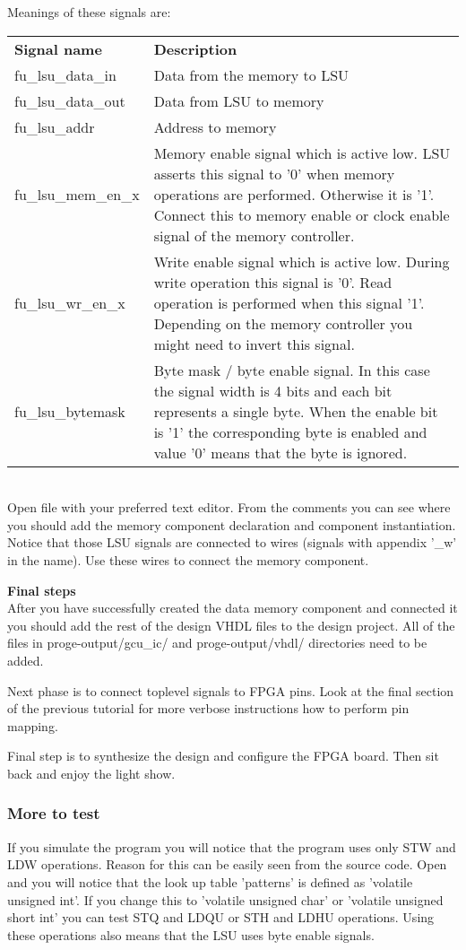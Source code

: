 \documentclass[twoside]{tceusermanual}
\begin{document}
Meanings of these signals are:

\begin{tabular}{p{}p{}}
 \textbf{Signal name} & \textbf{Description} \\
 fu\_lsu\_data\_in & Data from the memory to LSU \\
 fu\_lsu\_data\_out & Data from LSU to memory \\
 fu\_lsu\_addr & Address to memory \\
 fu\_lsu\_mem\_en\_x & Memory enable signal which is active low. LSU asserts
 this signal to '0' when memory operations are performed. Otherwise it is '1'.
 Connect this to memory enable or clock enable signal of the memory
 controller. \\
 fu\_lsu\_wr\_en\_x & Write enable signal which is active low. During write
 operation this signal is '0'. Read operation is performed when this signal
 '1'. Depending on the memory controller you might need to invert this
 signal. \\
 fu\_lsu\_bytemask & Byte mask / byte enable signal. In this case the signal
 width is 4 bits and each bit represents a single byte. When the enable bit is
 '1' the corresponding byte is enabled and value '0' means that the byte is
 ignored. \\
\end{tabular} \\

Open file  with your preferred text editor.
From the comments you can see where you should add the memory component
declaration and component instantiation. Notice that those LSU signals are 
connected to wires (signals with appendix '\_w' in the name). Use these wires
to connect the memory component.

\textbf{Final steps} \\
After you have successfully created the data memory component and connected it
you should add the rest of the design VHDL files to the design project. All of
the files in proge-output/gcu\_ic/ and proge-output/vhdl/ directories need to
be added.

Next phase is to connect toplevel signals to FPGA pins. Look at the final
section of the previous tutorial for more verbose instructions how to
perform pin mapping.

Final step is to synthesize the design and configure the FPGA board. Then sit
back and enjoy the light show.

\subsubsection{More to test}
If you simulate the program you will notice that the program uses only STW and
LDW operations. Reason for this can be easily seen from the source code. Open
 and you will notice that the look up table 'patterns' is
defined as 'volatile unsigned int'. If you change this to 'volatile unsigned
char' or 'volatile unsigned short int' you can test STQ and LDQU or STH and
LDHU operations. Using these operations also means that the LSU uses byte
enable signals.
\end{document}
